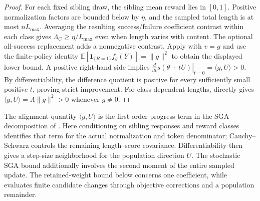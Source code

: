 \begin{proof}
For each fixed sibling draw, the sibling mean reward lies in $[0,1]$.
Positive normalization factors are bounded below by $\eta$, and the sampled
total length is at most $nL_{\max}$. Averaging the resulting success/failure
coefficient contrast within each class gives
$\Lambda_C\ge\eta/L_{\max}$ even when length varies with content.
The optional all-success replacement adds a nonnegative contrast.
Apply  with $v=g$ and use the
finite-policy identity
$\mathbb E[\mathbf 1_{\{R=1\}}f_g(Y)]=\|g\|^2$ to obtain the displayed
lower bound. A positive right-hand side implies
$\left.\frac{d}{dt}s(\theta+tU)\right|_{t=0}=\langle g,U\rangle>0$.
By differentiability, the difference quotient is positive for every
sufficiently small positive $t$, proving strict improvement.
For class-dependent lengths,  directly
gives $\langle g,U\rangle=\Lambda\|g\|^2>0$ whenever $g\ne0$.

\end{proof}

The alignment quantity $\langle g,U\rangle$ is the first-order progress
term in the SGA decomposition of \citet[Section~2]{li2025sga}.
Here conditioning on sibling responses and reward classes identifies that
term for the actual normalization and token denominator; Cauchy--Schwarz
controls the remaining length--score covariance. Differentiability then
gives a step-size neighborhood for the population direction $U$.
The stochastic SGA bound additionally involves the second moment of the
entire sampled update. The retained-weight bound below concerns one
coefficient, while  evaluates finite candidate
changes through objective corrections and a population remainder.

